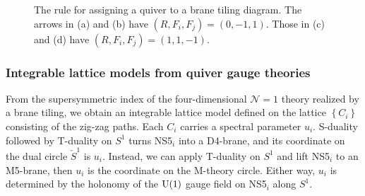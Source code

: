 \begin{figure}
{
    }
  \qquad
  \caption{The rule for assigning a quiver to a brane tiling diagram. 
  The arrows in (a) and (b) have $(R, F_i, F_j)=(0, -1, 1)$. Those in 
  (c) and (d) have $(R, F_i, F_j)=(1, 1, -1)$.}
  \label{fig:rule_for_quiver}
\end{figure}





\subsubsection{Integrable lattice models from quiver gauge theories}

From the supersymmetric index of the four-dimensional $\mathcal{N}=1$
theory realized by a brane tiling, we obtain an integrable lattice
model defined on the lattice $\left\{ C_{i}\right\} $ consisting
of the zig-zag paths. Each $C_{i}$ carries a spectral parameter $u_{i}$.
S-duality followed by T-duality on $S^{1}$ turns NS5$_{i}$ into
a D4-brane, and its coordinate on the dual circle $\check{S}^{1}$
is $u_{i}$. Instead, we can apply T-duality on $S^{1}$ and lift
NS5$_{i}$ to an M5-brane, then $u_{i}$ is the coordinate on the
M-theory circle. Either way, $u_{i}$ is determined by the holonomy
of the $\mathrm{U}(1)$ gauge field on NS5$_{i}$ along $S^{1}$. 

